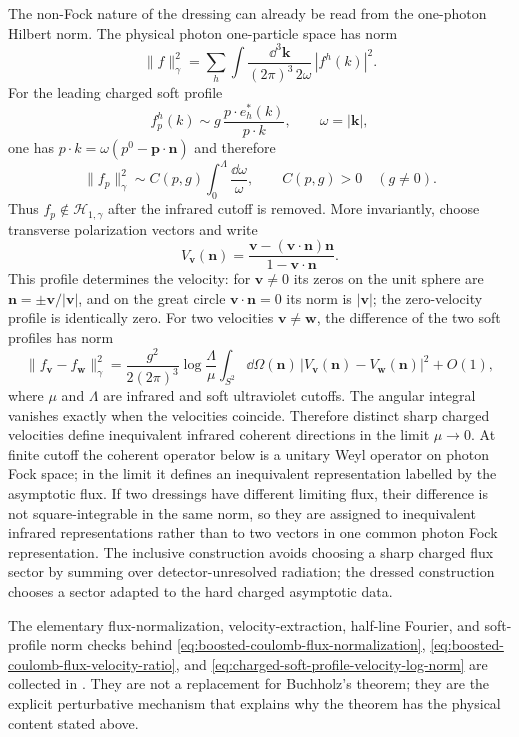 The non-Fock nature of the dressing can already be read from the one-photon
Hilbert norm.  The physical photon one-particle space has norm
\[
  \|f\|_{\gamma}^2
  =
  \sum_h
  \int
  \frac{\dd^3\mathbf k}{(2\pi)^3\,2\omega}\,
  |f^h(k)|^2 .
\]
For the leading charged soft profile
\[
  f_p^h(k)\sim g\,\frac{p\cdot e_h^*(k)}{p\cdot k},
  \qquad \omega=|\mathbf k|,
\]
one has \(p\cdot k=\omega(p^0-\mathbf p\cdot\mathbf n)\) and therefore
\[
  \|f_p\|_{\gamma}^2
  \sim
  C(p,g)\int_0^\Lambda\frac{\dd\omega}{\omega},
  \qquad C(p,g)>0\quad(g\ne0).
\]
Thus \(f_p\notin\mathcal H_{1,\gamma}\) after the infrared cutoff is removed.
More invariantly, choose transverse polarization vectors and write
\[
  V_{\mathbf v}(\mathbf n)
  =
  \frac{\mathbf v-(\mathbf v\cdot\mathbf n)\mathbf n}
       {1-\mathbf v\cdot\mathbf n}.
\]
This profile determines the velocity: for \(\mathbf v\ne0\) its zeros on
the unit sphere are \(\mathbf n=\pm\mathbf v/|\mathbf v|\), and on the great
circle \(\mathbf v\cdot\mathbf n=0\) its norm is \(|\mathbf v|\); the
zero-velocity profile is identically zero.
For two velocities \(\mathbf v\ne\mathbf w\), the difference of the two soft
profiles has norm
\begin{equation}
  \|f_{\mathbf v}-f_{\mathbf w}\|_\gamma^2
  =
  \frac{g^2}{2(2\pi)^3}
  \log\frac{\Lambda}{\mu}
  \int_{S^2}\dd\Omega(\mathbf n)\,
  |V_{\mathbf v}(\mathbf n)-V_{\mathbf w}(\mathbf n)|^2
  +O(1),
  \label{eq:charged-soft-profile-velocity-log-norm}
\end{equation}
where \(\mu\) and \(\Lambda\) are infrared and soft ultraviolet cutoffs.  The
angular integral vanishes exactly when the velocities coincide.  Therefore
distinct sharp charged velocities define inequivalent infrared coherent
directions in the limit \(\mu\to0\).
At finite cutoff the coherent operator below is a unitary Weyl operator on
photon Fock space; in the limit it defines an inequivalent representation
labelled by the asymptotic flux.  If two dressings have different limiting
flux, their difference is not square-integrable in the same norm, so they are
assigned to inequivalent infrared representations rather than to two vectors
in one common photon Fock representation.  The inclusive construction avoids
choosing a sharp charged flux sector by summing over detector-unresolved
radiation; the dressed construction chooses a sector adapted to the hard
charged asymptotic data.

The elementary flux-normalization, velocity-extraction, half-line Fourier,
and soft-profile norm checks behind
\eqref{eq:boosted-coulomb-flux-normalization},
\eqref{eq:boosted-coulomb-flux-velocity-ratio}, and
\eqref{eq:charged-soft-profile-velocity-log-norm} are collected in
.  They are not
a replacement for Buchholz's theorem; they are the explicit perturbative
mechanism that explains why the theorem has the physical content stated
above.

